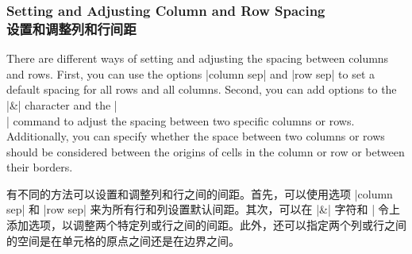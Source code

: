 \begin{codeexample}[]
\end{codeexample}

\begin{codeexample}[]
\end{codeexample}


\subsubsection{Setting and Adjusting Column and Row Spacing\\设置和调整列和行间距}

There are different ways of setting and adjusting the spacing between columns
and rows. First, you can use the options |column sep| and |row sep| to set a
default spacing for all rows and all columns. Second, you can add options to
the |&| character and the |\\| command to adjust the spacing between two
specific columns or rows. Additionally, you can specify whether the space
between two columns or rows should be considered between the origins of cells
in the column or row or between their borders.

有不同的方法可以设置和调整列和行之间的间距。首先，可以使用选项 |column sep| 和 |row sep| 来为所有行和列设置默认间距。其次，可以在 |&| 字符和 |\| 命令上添加选项，以调整两个特定列或行之间的间距。此外，还可以指定两个列或行之间的空间是在单元格的原点之间还是在边界之间。

